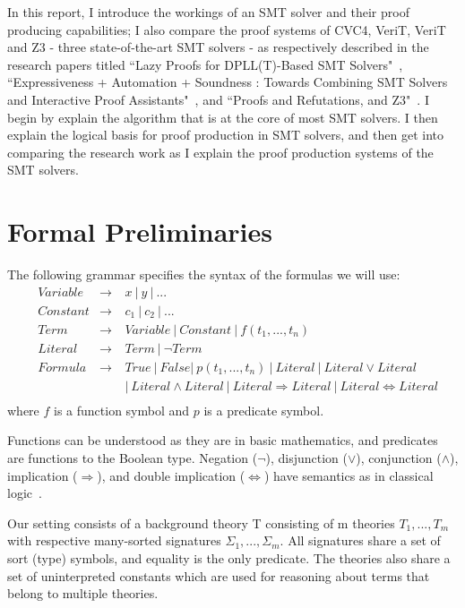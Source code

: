 \documentclass{article}
\begin{document}
In this report, I introduce the workings of an SMT solver 
and their proof producing capabilities; I also compare the 
proof systems of CVC4, VeriT, VeriT and Z3 - three 
state-of-the-art SMT solvers - as respectively 
described in the research papers titled ``Lazy Proofs for 
DPLL(T)-Based SMT Solvers"~\cite{DBLP:conf/fmcad/2016}, 
``Expressiveness + Automation + Soundness : 
Towards Combining SMT Solvers and Interactive 
Proof Assistants"~\cite{DBLP:conf/tacas/2006}, 
and ``Proofs and Refutations, and Z3"~\cite{DBLP:conf/lpar/2008w}.
I begin by explain the algorithm that is at the core 
of most SMT solvers. I then explain the logical basis for 
proof production in SMT solvers, and then get into 
comparing the research work as I explain the proof 
production systems of the SMT solvers.


\section{Formal Preliminaries}
\label{sec:prelim}
The following grammar specifies the syntax of the formulas we
will use: 
\begin{align*}
&Variable &\rightarrow\  &x\ |\ y\ |\ ...  \\
&Constant &\rightarrow\ &c_1\ |\ c_2\ |\ ...  \\
&Term &\rightarrow\ &Variable\ |\ Constant\ |\ f(t_1, ..., t_n) \\
&Literal &\rightarrow\ &Term\ |\ \neg Term \\
&Formula &\rightarrow\ &True\ |\ False |\ p(t_1, ..., t_n)\ 
					|\ Literal\ |\ Literal \lor Literal \\ 
& & &				|\ Literal \land Literal\ 
					|\ Literal \Rightarrow Literal\ 
					|\ Literal \iff Literal \\
\end{align*}
where $f$ is a function symbol and $p$ is a predicate symbol.

Functions can be understood as they are in basic mathematics, 
and predicates are functions to the Boolean type. Negation 
($\neg$), disjunction ($\lor$), conjunction ($\land$), 
implication ($\Rightarrow$), and double implication
($\iff$) have semantics as in classical logic~\cite{prop}.

Our setting consists of a background theory T consisting 
of m theories $T_1, ..., T_m$ with respective many-sorted 
signatures $\Sigma_1, ..., \Sigma_m$. All signatures share 
a set of sort (type) symbols, and equality is the only 
predicate. The theories also share a set of 
uninterpreted constants which are used for reasoning about 
terms that belong to multiple theories. 
\end{document}
